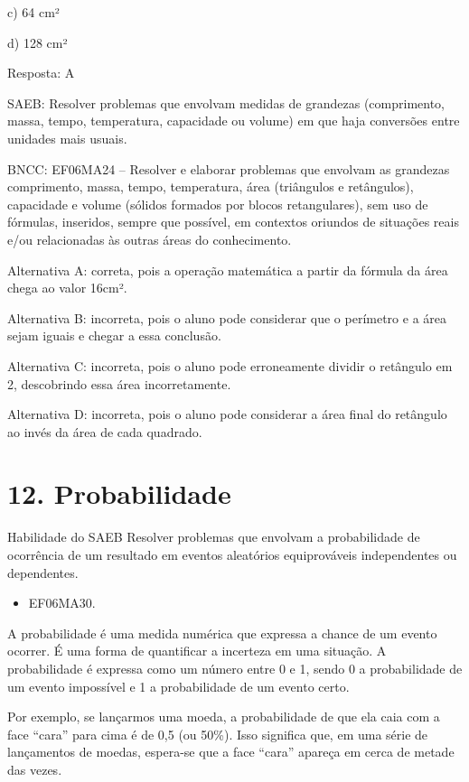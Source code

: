 c) 64 cm²

d) 128 cm²

Resposta: A

SAEB: Resolver problemas que envolvam medidas de grandezas (comprimento,
massa, tempo, temperatura, capacidade ou volume) em que haja conversões
entre unidades mais usuais.

BNCC: EF06MA24 -- Resolver e elaborar problemas que envolvam as
grandezas comprimento, massa, tempo, temperatura, área (triângulos e
retângulos), capacidade e volume (sólidos formados por blocos
retangulares), sem uso de fórmulas, inseridos, sempre que possível, em
contextos oriundos de situações reais e/ou relacionadas às outras áreas
do conhecimento.

Alternativa A: correta, pois a operação matemática a partir da fórmula
da área chega ao valor 16cm².

Alternativa B: incorreta, pois o aluno pode considerar que o perímetro e
a área sejam iguais e chegar a essa conclusão.

Alternativa C: incorreta, pois o aluno pode erroneamente dividir o
retângulo em 2, descobrindo essa área incorretamente.

Alternativa D: incorreta, pois o aluno pode considerar a área final do
retângulo ao invés da área de cada quadrado.

\chapter{12. Probabilidade}

Habilidade do SAEB Resolver problemas que envolvam a probabilidade de
ocorrência de um resultado em eventos aleatórios equiprováveis
independentes ou dependentes.


\begin{itemize}
\item EF06MA30.
\end{itemize}

A probabilidade é uma medida numérica que expressa a chance de um evento
ocorrer. É uma forma de quantificar a incerteza em uma situação. A
probabilidade é expressa como um número entre 0 e 1, sendo 0 a
probabilidade de um evento impossível e 1 a probabilidade de um evento
certo.

Por exemplo, se lançarmos uma moeda, a probabilidade de que ela caia com
a face ``cara'' para cima é de 0,5 (ou 50\%). Isso significa que, em uma
série de lançamentos de moedas, espera-se que a face ``cara'' apareça em
cerca de metade das vezes.

